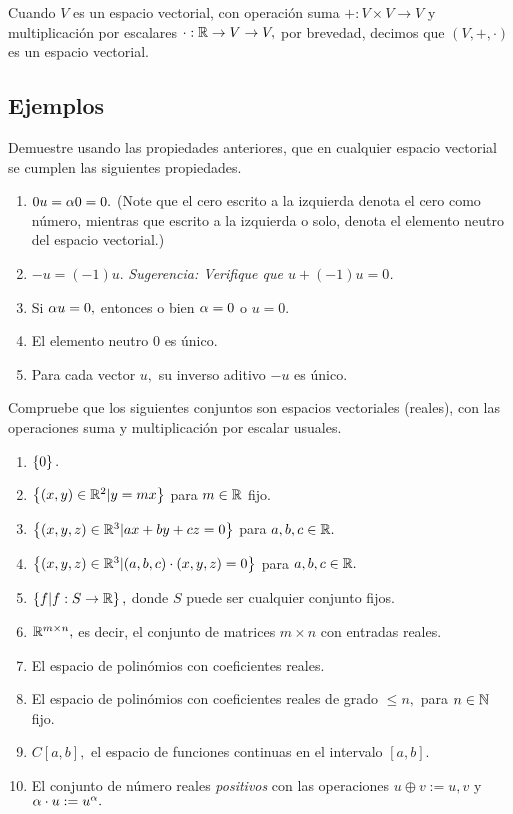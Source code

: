 \begin{observacion}
 Cuando $V$ es un espacio vectorial, con operaci\'on suma $+:V \times V \to V$ y multiplicaci\'on por escalares
$\cdot:\mathbb{R} \to V \to V,$ por brevedad, decimos que $(V, +, \cdot)$ es un espacio vectorial.
\end{observacion}



\subsection*{Ejemplos}


\begin{resuelto}[\dag]
Demuestre usando las propiedades anteriores, que en cualquier espacio vectorial se cumplen las siguientes propiedades.
\begin{enumerate}
 \item $0  u=\alpha  0=0.$ (Note que el cero escrito a la izquierda denota el cero como número, mientras que escrito a la izquierda o solo, denota el elemento neutro  del espacio vectorial.)
 \item $-u=(-1) u.$ \emph{Sugerencia: Verifique que $u+(-1)u=0$.}
 \item Si $\alpha u=0,$ entonces o bien $\alpha=0$ o $u=0.$
 \item El elemento neutro $0$ es único.
 \item Para cada vector $u,$ su inverso aditivo $-u$ es único.
\end{enumerate}
\end{resuelto}

\begin{resuelto}
 Compruebe que los siguientes conjuntos son espacios vectoriales (reales), con las operaciones suma y multiplicaci\'on por escalar usuales.
 \begin{enumerate}
 \item $\left\{ 0 \right\}.$
 \item $\left\{ (x,y)\in \mathbb{R}^{2}|y=mx \right\}$ para $m\in \mathbb{R}$ fijo.
 \item $\left\{ (x,y,z)\in \mathbb{R}^{3}| ax+by+cz=0 \right\}$ para $a,b,c\in \mathbb{R}.$
 \item $\left\{ (x,y,z)\in \mathbb{R}^{3}|(a,b,c)\cdot (x,y,z)=0 \right\}$ para $a,b,c\in \mathbb{R}.$
  \item $\left\{ f|f:S\to \mathbb{R} \right\},$ donde $S$ puede ser cualquier conjunto fijos.
  \item $\mathbb{R}^{m\times n},$ es decir, el conjunto de matrices $m\times n$ con entradas reales.
  \item  El espacio de polin\'omios con coeficientes reales.
  \item El espacio de polin\'omios con coeficientes reales de grado $\leq n,$ para $n \in \mathbb{N}$ fijo.
  \item $C[a,b],$ el espacio de funciones continuas en el intervalo $[a,b].$
  \item El conjunto de número reales \emph{positivos} con las operaciones $u\oplus v:= u,v$ y $\alpha \cdot u:=u^{\alpha}.$
 \end{enumerate}
\end{resuelto}

